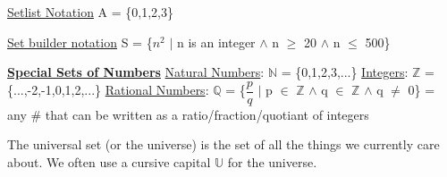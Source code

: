 \documentclass{article}
\begin{document}
\underline{Setlist Notation}\newline
A = \{0,1,2,3\}\newline

\underline{Set builder notation}\newline
S = \{$n^2$ $\mid$ n is an integer $\wedge$ n $\geq$ 20 $\wedge$ n $\leq$ 500\}\newline

\textbf{\underline{Special Sets of Numbers}}\newline
\underline{Natural Numbers}:	$\mathbb{N}$ = \{0,1,2,3,...\}\newline
\underline{Integers}:	$\mathbb{Z}$ = \{...,-2,-1,0,1,2,...\}\newline
\underline{Rational Numbers}:	$\mathbb{Q}$ = \{$\dfrac{p}{q}$ $\mid$ p $\in$ $\mathbb{Z}$ $\wedge$ q $\in$ $\mathbb{Z}$ $\wedge$ q $\neq$ 0\}\newline
= any \# that can be written as a ratio/fraction/quotiant of integers\newline

The universal set (or the universe) is the set of all the things we currently care about. We often use a cursive capital $\mathbb{U}$ for the universe.
\end{document}
